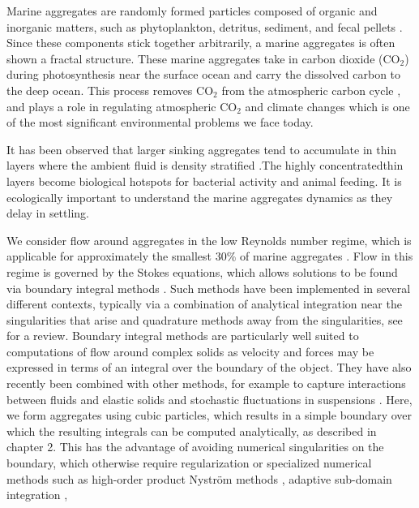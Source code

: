 Marine aggregates are randomly formed particles composed of organic and inorganic matters, such as phytoplankton, detritus, sediment, and fecal pellets \cite{jackson_simulation_1989}. Since these components stick together arbitrarily, a marine aggregates is often shown a fractal structure. 
These marine aggregates take in carbon dioxide (CO$_2$) during photosynthesis near the surface ocean and carry the dissolved carbon to the deep ocean. 
This process removes CO$_2$ from the atmospheric carbon cycle \cite{honjo_understanding_2014}, and plays a role in regulating atmospheric CO$_2$ and climate changes which is one of the most significant environmental problems we face today. 
 \par
 It has been observed that larger sinking aggregates tend to accumulate in thin layers where the ambient fluid is density stratified \cite{alldredge_occurrence_2002}.The highly concentratedthin layers become biological hotspots for bacterial activity and animal feeding. It is ecologically important to understand the marine aggregates dynamics as they delay in settling.
\par
We consider flow around aggregates in the low Reynolds number regime, which is applicable for approximately the smallest 30\% of marine aggregates \cite{alldredge_situ_1988}. Flow in this regime is governed by the Stokes equations, which allows solutions to be found via boundary integral methods \cite{pozrikidis_boundary_1992}. Such methods  have been implemented in several different contexts, typically via a combination of analytical integration near the singularities that arise and quadrature methods away from the singularities, see \cite{pozrikidis_boundary_1992} for a review. Boundary integral methods
are particularly well suited to computations of flow around complex solids  \cite{zinchenko_boundary-integral_2006}  as velocity and forces may be expressed in terms of an integral over the boundary of the object. 
They have also recently been combined with other methods, for example to capture interactions between fluids and elastic solids \cite{bao_immersed_2017} and stochastic fluctuations in suspensions \cite{bao_fluctuating_2018}.
Here, we form aggregates using cubic particles, which results in a simple boundary over which the resulting integrals can be computed analytically, as described in chapter 2.
This has the advantage of avoiding numerical singularities on the boundary, which otherwise require regularization \cite{cortez_method_2001} or specialized numerical methods such as high-order product Nystr\"{o}m methods \cite{atkinson_numerical_1997, delves_computational_1985}, adaptive sub-domain integration \cite{chan_second-order_1992},
